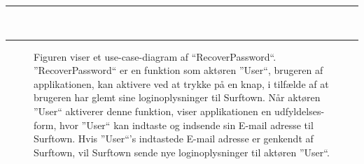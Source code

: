 \documentclass[12pt]{article}
\begin{document}
	\rule{430pt}{0.4pt}
	\\\rule{430pt}{0.4pt}
\vspace{-30pt}
\begin{figure}[!h]
	\caption{Figuren viser et use-case-diagram af ``RecoverPassword``. ''RecoverPassword`` er en funktion som aktøren  ''User``, brugeren af applikationen, kan aktivere ved at trykke på en knap, i tilfælde af at brugeren har glemt sine loginoplysninger til Surftown. Når aktøren ''User`` aktiverer denne funktion, viser applikationen en udfyldelses-form, hvor ''User`` kan indtaste og indsende sin E-mail adresse til Surftown. Hvis ''User``'s indtastede E-mail adresse er genkendt af Surftown, vil Surftown sende nye loginoplysninger til aktøren ''User``.}
	\label{RecoverPasswordUseCase}
\end{figure}\\
\end{document}
